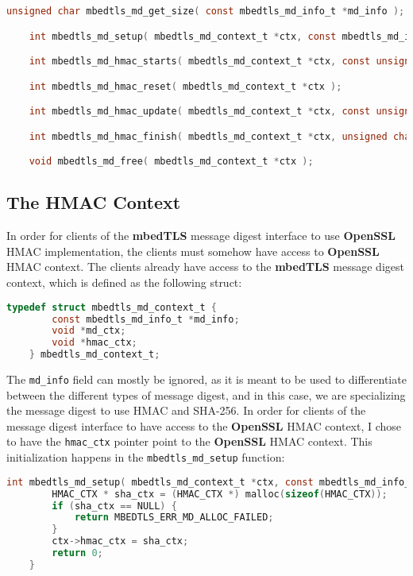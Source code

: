 \documentclass[pageno]{jpaper}
\newcommand{\stdtitle}[1]{\textbf{#1}}
\begin{document}
\begin{lstlisting}[language=C]
    unsigned char mbedtls_md_get_size( const mbedtls_md_info_t *md_info );

    int mbedtls_md_setup( mbedtls_md_context_t *ctx, const mbedtls_md_info_t *md_info, int hmac );

    int mbedtls_md_hmac_starts( mbedtls_md_context_t *ctx, const unsigned char *key, size_t keylen );

    int mbedtls_md_hmac_reset( mbedtls_md_context_t *ctx );

    int mbedtls_md_hmac_update( mbedtls_md_context_t *ctx, const unsigned char *input, size_t ilen );

    int mbedtls_md_hmac_finish( mbedtls_md_context_t *ctx, unsigned char *output);

    void mbedtls_md_free( mbedtls_md_context_t *ctx );
\end{lstlisting}

\subsection{The HMAC Context}

In order for clients of the \stdtitle{mbedTLS} message digest interface to use \stdtitle{OpenSSL} HMAC implementation, the clients must somehow have access to \stdtitle{OpenSSL} HMAC context. The clients already have access to the \stdtitle{mbedTLS} message digest context, which is defined as the following struct:

\begin{lstlisting}[language=C]
    typedef struct mbedtls_md_context_t {
        const mbedtls_md_info_t *md_info;
        void *md_ctx;
        void *hmac_ctx;
    } mbedtls_md_context_t;
\end{lstlisting}

The \lstinline{md_info} field can mostly be ignored, as it is meant to be used to differentiate between the different types of message digest, and in this case, we are specializing the message digest to use HMAC and SHA-256. In order for clients of the message digest interface to have access to the \stdtitle{OpenSSL} HMAC context, I chose to have the \lstinline{hmac_ctx} pointer point to the \stdtitle{OpenSSL} HMAC context. This initialization happens in the \lstinline{mbedtls_md_setup} function:

\begin{lstlisting}[language=C]
    int mbedtls_md_setup( mbedtls_md_context_t *ctx, const mbedtls_md_info_t *md_info, int hmac ) {
        HMAC_CTX * sha_ctx = (HMAC_CTX *) malloc(sizeof(HMAC_CTX));
        if (sha_ctx == NULL) {
            return MBEDTLS_ERR_MD_ALLOC_FAILED;
        }
        ctx->hmac_ctx = sha_ctx;
        return 0;
    }
\end{lstlisting}
\end{document}
